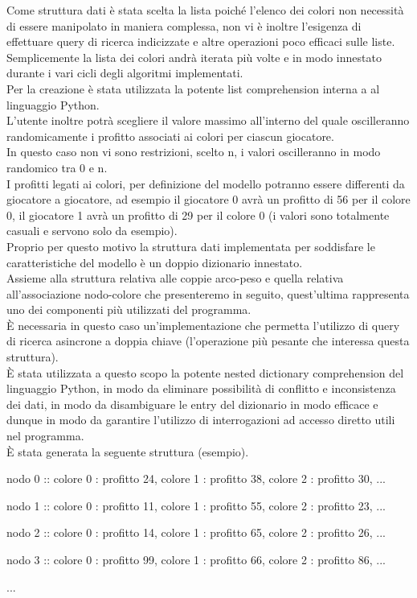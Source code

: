 Come struttura dati è stata scelta la lista poiché l'elenco dei colori non necessità di essere manipolato in maniera complessa, non vi è inoltre l'esigenza di effettuare query di ricerca indicizzate e altre operazioni poco efficaci sulle liste.\\
Semplicemente la lista dei colori andrà iterata più volte e in modo innestato durante i vari cicli degli algoritmi implementati.\\
Per la creazione è stata utilizzata la potente list comprehension interna a al linguaggio Python.\\

L'utente inoltre potrà scegliere il valore massimo all'interno del quale oscilleranno randomicamente i profitto associati ai colori per ciascun giocatore.\\
In questo caso non vi sono restrizioni, scelto n, i valori oscilleranno in modo randomico tra 0 e n.\\
I profitti legati ai colori, per definizione del modello potranno essere differenti da giocatore a giocatore, ad esempio il giocatore 0 avrà un profitto di 56 per il colore 0, il giocatore 1 avrà un profitto di 29 per il colore 0 (i valori sono totalmente casuali e servono solo da esempio).\\

Proprio per questo motivo la struttura dati implementata per soddisfare le caratteristiche del modello è un doppio dizionario innestato.\\
Assieme alla struttura relativa alle coppie arco-peso e quella relativa all'associazione nodo-colore che presenteremo in seguito, quest'ultima rappresenta uno dei componenti più utilizzati del programma.\\
È necessaria in questo caso un'implementazione che permetta l'utilizzo di query di ricerca asincrone a doppia chiave (l'operazione più pesante che interessa questa struttura).\\
È stata utilizzata a questo scopo la potente nested dictionary comprehension del linguaggio Python, in modo da eliminare possibilità di conflitto e inconsistenza dei dati, in modo da disambiguare le entry del dizionario in modo efficace e dunque in modo da garantire l'utilizzo di interrogazioni ad accesso diretto utili nel programma.\\
È stata generata la seguente struttura (esempio).

\begin{description}
	\item nodo 0 :: colore 0 : profitto 24, colore 1 : profitto 38, colore 2 : profitto 30, ...
	\item nodo 1 :: colore 0 : profitto 11, colore 1 : profitto 55, colore 2 : profitto 23, ...
	\item nodo 2 :: colore 0 : profitto 14, colore 1 : profitto 65, colore 2 : profitto 26, ...
	\item nodo 3 :: colore 0 : profitto 99, colore 1 : profitto 66, colore 2 : profitto 86, ...
	\item ...
\end{description}


